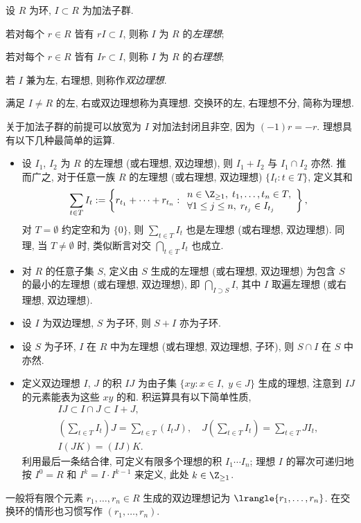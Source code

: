 \begin{definition}\label{def:ideals}
	设 $R$ 为环, $I \subset R$ 为加法子群.
	\begin{compactenum}[(i)]
		\item 若对每个 $r \in R$ 皆有 $rI \subset I$, 则称 $I$ 为 $R$ 的\emph{左理想};
		\item 若对每个 $r \in R$ 皆有 $Ir \subset I$, 则称 $I$ 为 $R$ 的\emph{右理想};
		\item 若 $I$ 兼为左, 右理想, 则称作\emph{双边理想}.
	\end{compactenum}
	满足 $I \neq R$ 的左, 右或双边理想称为真理想. 交换环的左, 右理想不分, 简称为理想.
\end{definition}
关于加法子群的前提可以放宽为 $I$ 对加法封闭且非空, 因为 $(-1)r = -r$. 理想具有以下几种最简单的运算.
\begin{itemize}
	\item 设 $I_1$, $I_2$ 为 $R$ 的左理想 (或右理想, 双边理想), 则 $I_1 + I_2$ 与 $I_1 \cap I_2$ 亦然. 推而广之, 对于任意一族 $R$ 的左理想 (或右理想, 双边理想) $\{ I_t: t \in T \}$, 定义其和
		\[ \sum_{t \in T} I_t := \left\{ r_{t_1} + \cdots + r_{t_n} :
		\begin{array}{l}
			n \in \Z_{\geq 1}, \; t_1, \ldots, t_n \in T, \\
			\forall 1 \leq j \leq n, \; r_{t_j} \in I_{t_j}
		\end{array} \right\}, \]
		对 $T = \emptyset$ 约定空和为 $\{0\}$, 则 $\sum_{t \in T} I_t$ 也是左理想 (或右理想, 双边理想). 同理, 当 $T \neq \emptyset$ 时, 类似断言对交 $\bigcap_{t \in T} I_t$ 也成立.
	\item 对 $R$ 的任意子集 $S$, 定义由 $S$ 生成的左理想 (或右理想, 双边理想) 为包含 $S$ 的最小的左理想 (或右理想, 双边理想), 即 $\bigcap_{I \supset S} I$, 其中 $I$ 取遍左理想 (或右理想, 双边理想).
	\item 设 $I$ 为双边理想, $S$ 为子环, 则 $S+I$ 亦为子环.
	\item 设 $S$ 为子环, $I$ 在 $R$ 中为左理想 (或右理想, 双边理想, 子环), 则 $S \cap I$ 在 $S$ 中亦然.
	\item 定义双边理想 $I$, $J$ 的积 $IJ$ 为由子集 $\{xy : x \in I,\; y \in J\}$ 生成的理想, 注意到 $IJ$ 的元素能表为这些 $xy$ 的和. 积运算具有以下简单性质,
		\begin{gather*}
			IJ \subset I \cap J \subset I+J, \\
			(\sum_{t \in T} I_t) J = \sum_{t \in T} (I_t J), \quad J(\sum_{t \in T} I_t) = \sum_{t \in T} J I_t, \\
			I(JK) = (IJ)K.
		\end{gather*}
		利用最后一条结合律, 可定义有限多个理想的积 $I_1 \cdots I_n$; 理想 $I$ 的幂次可递归地按 $I^0 = R$ 和 $I^k = I \cdot I^{k-1}$ 来定义, 此处 $k \in \Z_{\geq 1}$. 
\end{itemize}
一般将有限个元素 $r_1, \ldots, r_n \in R$ 生成的双边理想记为 $\lrangle{r_1, \ldots, r_n}$. 在交换环的情形也习惯写作 $(r_1, \ldots, r_n)$.

